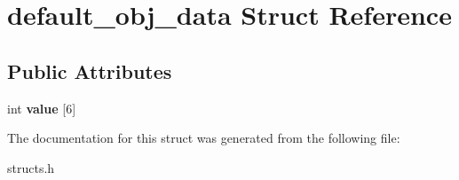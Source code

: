 \hypertarget{structdefault__obj__data}{\section{default\-\_\-obj\-\_\-data Struct Reference}
\label{structdefault__obj__data}
}
\subsection*{Public Attributes}
\begin{DoxyCompactItemize}
\item 
\hypertarget{structdefault__obj__data_a99141d7e97c64a4ec81426749ab02226}{int {\bfseries value} \mbox{[}6\mbox{]}}\label{structdefault__obj__data_a99141d7e97c64a4ec81426749ab02226}

\end{DoxyCompactItemize}


The documentation for this struct was generated from the following file\-:\begin{DoxyCompactItemize}
\item 
structs.\-h\end{DoxyCompactItemize}
